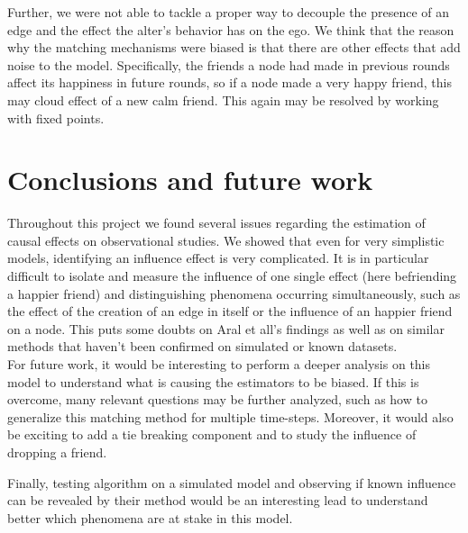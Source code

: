 \documentclass[11pt]{article}
\begin{document}
Further, we were not able to tackle a proper way to decouple the presence of an edge and the effect the alter's behavior has on the ego. We think that the reason why the matching mechanisms were biased is that there are other effects that add noise to the model. Specifically, the friends a node had made in previous rounds affect its happiness in future rounds, so if a node made a very happy friend, this may cloud effect of a new calm friend. This again may be resolved by working with fixed points.
\FloatBarrier


\section{Conclusions and future work}
Throughout this project we found several issues regarding the estimation of causal effects on observational studies. We showed that even for very simplistic models, identifying an influence effect is very complicated. It is in particular difficult to isolate and measure the influence of one single effect (here befriending a happier friend) and distinguishing phenomena occurring simultaneously, such as the effect of the creation of an edge in itself or the influence of an happier friend on a node. This puts some doubts on Aral et all’s findings as well as on similar methods that haven’t been confirmed on simulated or known datasets. \\

For future work, it would be interesting to perform a deeper analysis on this model to understand what is causing the estimators to be biased. If this is overcome, many relevant questions may be further analyzed, such as how to generalize this matching method for multiple time-steps. Moreover, it would also be exciting to add a tie breaking component and to study the influence of dropping a friend.

Finally, testing \citep{aral2009distinguishing} algorithm on a simulated model and observing if known influence can be revealed by their method would be an interesting lead to understand better which phenomena are at stake in this model.
	

\newpage


\nocite{*}
\end{document}
